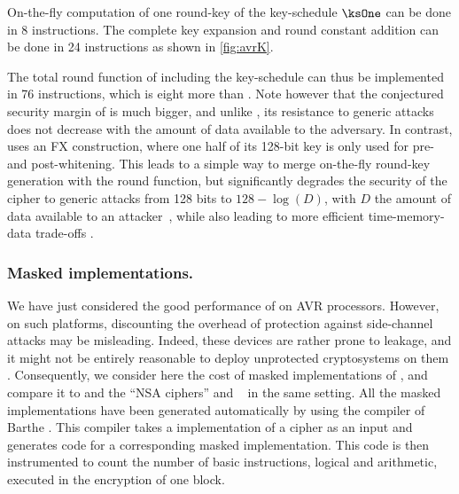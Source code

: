 On-the-fly computation of one round-key of the key-schedule $\ksOne$ can be done in 8 instructions. The complete key expansion and round constant addition can be done in 24 instructions
as shown in \autoref{fig:avrK}.

The total round function of \fly including the key-schedule can thus be implemented in 76 instructions, which is eight more than \pride. Note however that the conjectured security
margin of \fly is much bigger, and unlike \pride, its resistance to generic attacks does not decrease with the amount of data available to the adversary. In contrast,
\pride uses an FX construction,
where one half of its 128-bit key is only used for pre- and post-whitening. This
leads to a simple way to merge on-the-fly round-key generation with the round function, but significantly degrades the security of the cipher to generic attacks
from 128 bits to $128 - \log(D)$, with $D$ the amount of data available to an attacker~\cite{desx}, while also leading to more efficient time-memory-data trade-offs \cite{itaitmd}.

\subsubsection{Masked implementations.}
We have just considered the good performance of \fly on AVR processors. 
However, on such platforms, discounting the overhead of protection 
against side-channel attacks may be misleading. 
Indeed, these devices are rather prone to leakage, and it might not be 
entirely reasonable to deploy unprotected cryptosystems on them \cite{avrleak}.
Consequently, we consider here the cost of masked implementations of \fly, 
and compare it to \pride and the ``NSA ciphers'' \simon and \speck~\cite{NSAciph} in the same setting.
All the masked implementations have been generated automatically by 
using the compiler of Barthe \etal{} \cite{maskingcomp}.
This compiler takes a \C implementation of a cipher as an input and generates \C code for a corresponding masked implementation. This code is then instrumented to count the number of basic instructions,
\eg{} logical and arithmetic, executed in the encryption of one block.
 
